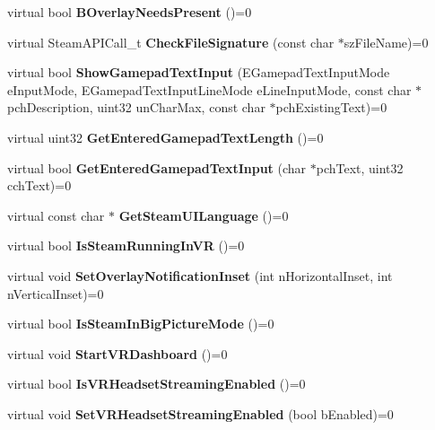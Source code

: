 \begin{DoxyCompactItemize}
\mbox{\label{class_i_steam_utils_a4590d2cda9dee5626e3b438fc3678ffd}} 
virtual bool {\bfseries B\+Overlay\+Needs\+Present} ()=0
\item 
\mbox{\label{class_i_steam_utils_a1baceda3ba820c08f62263523de0931f}} 
virtual Steam\+A\+P\+I\+Call\+\_\+t {\bfseries Check\+File\+Signature} (const char $\ast$sz\+File\+Name)=0
\item 
\mbox{\label{class_i_steam_utils_a2a7e6ae072711fe0611dd1d6aa3ed4fa}} 
virtual bool {\bfseries Show\+Gamepad\+Text\+Input} (E\+Gamepad\+Text\+Input\+Mode e\+Input\+Mode, E\+Gamepad\+Text\+Input\+Line\+Mode e\+Line\+Input\+Mode, const char $\ast$pch\+Description, uint32 un\+Char\+Max, const char $\ast$pch\+Existing\+Text)=0
\item 
\mbox{\label{class_i_steam_utils_a809a5472105c1d9175eccf7224af2d7a}} 
virtual uint32 {\bfseries Get\+Entered\+Gamepad\+Text\+Length} ()=0
\item 
\mbox{\label{class_i_steam_utils_a487ddbbe9c404d61a445ff70d8360928}} 
virtual bool {\bfseries Get\+Entered\+Gamepad\+Text\+Input} (char $\ast$pch\+Text, uint32 cch\+Text)=0
\item 
\mbox{\label{class_i_steam_utils_a0e22f9a75f3e869b351bb630aa3cc699}} 
virtual const char $\ast$ {\bfseries Get\+Steam\+U\+I\+Language} ()=0
\item 
\mbox{\label{class_i_steam_utils_a53c51ba1d343e9f4dbba5bfd553f5a37}} 
virtual bool {\bfseries Is\+Steam\+Running\+In\+VR} ()=0
\item 
\mbox{\label{class_i_steam_utils_a3d198c6ed15819d645b241eaefb0a73e}} 
virtual void {\bfseries Set\+Overlay\+Notification\+Inset} (int n\+Horizontal\+Inset, int n\+Vertical\+Inset)=0
\item 
\mbox{\label{class_i_steam_utils_a2ccc311f3f111d1d5287fbf1bb0e2ffe}} 
virtual bool {\bfseries Is\+Steam\+In\+Big\+Picture\+Mode} ()=0
\item 
\mbox{\label{class_i_steam_utils_ae080f6900d0a88801596f4adcfa27d57}} 
virtual void {\bfseries Start\+V\+R\+Dashboard} ()=0
\item 
\mbox{\label{class_i_steam_utils_a4fe76da84e53bdd7e752c946eb068395}} 
virtual bool {\bfseries Is\+V\+R\+Headset\+Streaming\+Enabled} ()=0
\item 
\mbox{\label{class_i_steam_utils_ac349084ad680d42a8314f4974e2a8e40}} 
virtual void {\bfseries Set\+V\+R\+Headset\+Streaming\+Enabled} (bool b\+Enabled)=0
\end{DoxyCompactItemize}


